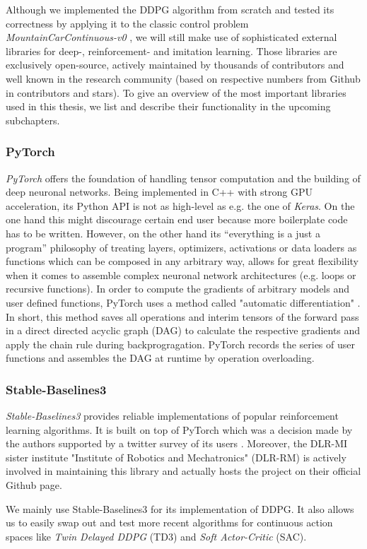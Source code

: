 Although we implemented the DDPG algorithm from scratch and tested its correctness by applying it to the classic control problem \textit{MountainCarContinuous-v0} \cite[]{moore1990efficient}, we will still make use of sophisticated external libraries for deep-, reinforcement- and imitation learning. Those libraries are exclusively open-source, actively maintained by thousands of contributors and well known in the research community (based on respective numbers from Github in contributors and stars). To give an overview of the most important libraries used in this thesis, we list and describe their functionality in the upcoming subchapters.

\subsubsection{PyTorch}
\textit{PyTorch} \cite[]{NEURIPS2019_9015} offers the foundation of handling tensor computation and the building of deep neuronal networks. Being implemented in C++ with strong GPU acceleration, its Python API is not as high-level as e.g. the one of \textit{Keras}. On the one hand this might discourage certain end user because more boilerplate code has to be written. However, on the other hand its  “everything is a just a program” philosophy \cite[p.~4]{NEURIPS2019_9015} of treating layers, optimizers, activations or data loaders as functions which can be composed in any arbitrary way, allows for great flexibility when it comes to assemble complex neuronal network architectures (e.g. loops or recursive functions). In order to compute the gradients of arbitrary models and user defined functions, PyTorch uses a method called "automatic differentiation" \cite[p.~5]{NEURIPS2019_9015}. In short, this method saves all operations and interim tensors of the forward pass in a direct directed acyclic graph (DAG) to calculate the respective gradients and apply the chain rule during backprogragation. PyTorch records the series of user functions and assembles the DAG at runtime by operation overloading.

\subsubsection{Stable-Baselines3}
\textit{Stable-Baselines3} \cite[]{stable-baselines3} provides reliable implementations of popular reinforcement learning algorithms. It is built on top of PyTorch which was a decision made by the authors supported by a twitter survey of its users \cite[]{pytorch-survey}. Moreover, the DLR-MI sister institute "Institute of Robotics and Mechatronics" (DLR-RM) is actively involved in maintaining this library and actually hosts the project on their official Github page.
\par
We mainly use Stable-Baselines3 for its implementation of DDPG. It also allows us to easily swap out and test more recent algorithms for continuous action spaces like \textit{Twin Delayed DDPG} (TD3) and \textit{Soft Actor-Critic} (SAC). 

